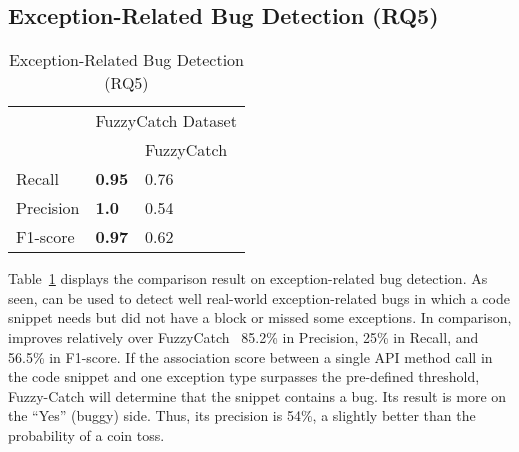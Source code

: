 \subsection{Exception-Related Bug Detection (RQ5)}
\label{sec:rq1}

\begin{table}[htpb]
  \caption {Exception-Related Bug Detection (RQ5)}
  \vspace{-12pt}
  \small
	\begin{center}
		\renewcommand{\arraystretch}{1}
		\begin{tabular}{|p{1.75cm}<{\centering}|p{1.75cm}<{\centering}|p{1.75cm}<{\centering}|}
		  \hline
			\multirow{2}{*}{} & \multicolumn{2}{c|}{FuzzyCatch Dataset} \\
			\cline{2-3}
			  & \tool  & FuzzyCatch~\cite{xrank-fse20} \\
			\hline
			Recall    & \textbf{0.95}& 0.76\\
			Precision & \textbf{1.0} & 0.54\\
			F1-score   & \textbf{0.97} & 0.62\\
			\hline
		\end{tabular}
		\label{tab:bug}
	\end{center}
\end{table}


Table~\ref{tab:bug} displays the comparison result on
exception-related bug detection. As seen, {\tool} can be used to
detect well real-world exception-related bugs in which a code snippet
needs but did not have a  block or missed some
exceptions. In comparison, {\tool} improves relatively over
FuzzyCatch~\cite{xrank-fse20} 85.2\% in Precision, 25\% in Recall, and
56.5\% in F1-score.
%
If the association score between a single API method call in the code
snippet and one exception type surpasses the pre-defined threshold, Fuzzy-Catch
will determine that the snippet contains a bug.
Its result is more on the ``Yes'' (buggy) side. Thus, its precision is
54\%, a slightly better than the probability of a coin
toss.

